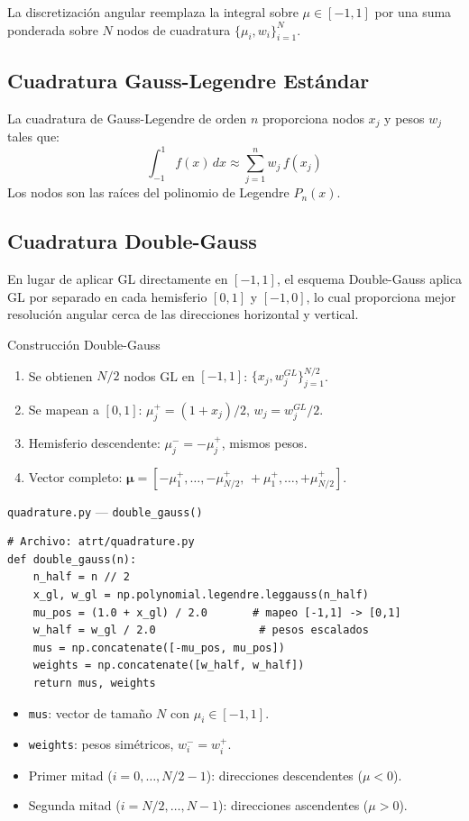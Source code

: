 \documentclass[a4paper,11pt]{article}
\begin{document}
La discretizaci\'on angular reemplaza la integral sobre $\mu \in [-1, 1]$ por una suma ponderada sobre $N$ nodos de cuadratura $\{\mu_i, w_i\}_{i=1}^{N}$.

\subsection{Cuadratura Gauss-Legendre Est\'andar}

La cuadratura de Gauss-Legendre de orden $n$ proporciona nodos $x_j$ y pesos $w_j$ tales que:
\begin{equation}
\int_{-1}^{1} f(x) \, dx \approx \sum_{j=1}^{n} w_j \, f(x_j)
\end{equation}
Los nodos son las ra\'ices del polinomio de Legendre $P_n(x)$.

\subsection{Cuadratura Double-Gauss}

En lugar de aplicar GL directamente en $[-1, 1]$, el esquema Double-Gauss aplica GL por separado en cada hemisferio $[0, 1]$ y $[-1, 0]$, lo cual proporciona mejor resoluci\'on angular cerca de las direcciones horizontal y vertical.

\begin{concept}{Construcci\'on Double-Gauss}
\begin{enumerate}
\item Se obtienen $N/2$ nodos GL en $[-1, 1]$: $\{x_j, w_j^{GL}\}_{j=1}^{N/2}$.
\item Se mapean a $[0, 1]$: $\mu_j^{+} = (1 + x_j)/2$, \quad $w_j = w_j^{GL}/2$.
\item Hemisferio descendente: $\mu_j^{-} = -\mu_j^{+}$, mismos pesos.
\item Vector completo: $\bm{\mu} = [-\mu_1^+, \ldots, -\mu_{N/2}^+, \, +\mu_1^+, \ldots, +\mu_{N/2}^+]$.
\end{enumerate}
\end{concept}

\begin{implementation}{\texttt{quadrature.py} --- \texttt{double\_gauss()}}
\begin{lstlisting}
# Archivo: atrt/quadrature.py
def double_gauss(n):
    n_half = n // 2
    x_gl, w_gl = np.polynomial.legendre.leggauss(n_half)
    mu_pos = (1.0 + x_gl) / 2.0       # mapeo [-1,1] -> [0,1]
    w_half = w_gl / 2.0                # pesos escalados
    mus = np.concatenate([-mu_pos, mu_pos])
    weights = np.concatenate([w_half, w_half])
    return mus, weights
\end{lstlisting}
\begin{itemize}
\item \texttt{mus}: vector de tama\~no $N$ con $\mu_i \in [-1, 1]$.
\item \texttt{weights}: pesos sim\'etricos, $w_i^{-} = w_i^{+}$.
\item Primer mitad ($i = 0, \ldots, N/2-1$): direcciones descendentes ($\mu < 0$).
\item Segunda mitad ($i = N/2, \ldots, N-1$): direcciones ascendentes ($\mu > 0$).
\end{itemize}
\end{implementation}
\end{document}
